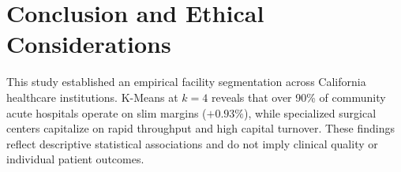 \documentclass[conference]{IEEEtran}
\begin{document}
\section{Conclusion and Ethical Considerations}
This study established an empirical facility segmentation across California healthcare institutions. K-Means at $k=4$ reveals that over 90\% of community acute hospitals operate on slim margins ($+0.93\%$), while specialized surgical centers capitalize on rapid throughput and high capital turnover. These findings reflect descriptive statistical associations and do not imply clinical quality or individual patient outcomes.



\end{document}
